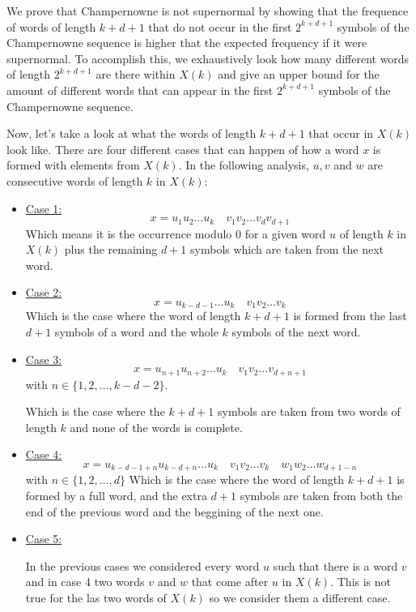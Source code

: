 \documentclass[11pt,a4paper]{tesis}
\theoremstyle{definition}
\begin{document}
We prove that Champernowne is not supernormal by showing that the frequence of words of length $k+d+1$ that do not occur in the first $2^{k+d+1}$ symbols of the Champernowne sequence is higher that the expected frequency if it were supernormal.
To accomplish this, we exhaustively look how many different words of length $2^{k+d+1}$ are there within $X(k)$ and give an upper bound for the amount of different words that can appear in the first $2^{k+d+1}$ symbols of the Champernowne sequence.

Now, let's take a look at what the words of length $k + d + 1$ that occur in $X(k)$ look like. There are four different cases that can happen of how a word $x$ is formed with elements from $X(k)$. 
In the following analysis, $u, v$ and $w$ are consecutive words of length $k$ in $X(k)$:

\begin{itemize}
  \item \underline{Case 1:} 
  $$x = u_1 u_2 \dots u_k \quad v_1 v_2 \dots v_{d} v_{d + 1}$$
    Which means it is the occurrence modulo 0 for a given word $u$ of length $k$ in $X(k)$ plus the remaining $d + 1$ symbols which are taken from the next word.

  \item \underline{Case 2:} 
  $$ x = u_{k-d-1} \dots u_k \quad v_1 v_2 \dots v_k$$
  Which is the case where the word of length $k + d + 1$ is formed from the last $d + 1$ symbols of a word and the whole $k$ symbols of the next word.

  \item \underline{Case 3:} 
  $$x = u_{n+1} u_{n+2} \dots u_k \quad  v_1 v_2 \dots v_{d+n+1} $$
with $n \in \{1,2,\dots ,k - d - 2\}$.

   Which is the case where the $k + d + 1$ symbols are taken from two words of length $k$ and none of the words is complete.

  
  \item \underline{Case 4:} 
  $$ x = u_{k-d-1+n} u_{k-d+n} \dots u_k \quad v_1 v_2 \dots v_k \quad w_1 w_2 \dots w_{d+1-n}$$
  with $n \in \{1, 2, \dots , d\}$
  Which is the case where the word of length $k + d + 1$ is formed by a full word, and the extra $d + 1$ symbols are taken from both the end of the previous word and the beggining of the next one.

  \item \underline{Case 5:} 
  
   In the previous cases we considered every word $u$ such that there is a word $v$ and in case 4 two words $v$ and $w$ that come after $u$ in $X(k)$. This is not true for the las two words of $X(k)$ so we consider them a different case.
  

\end{itemize}
\end{document}
